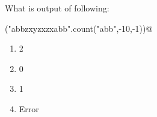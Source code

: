 \question
What is output of following:

\lstinline@print("abbzxyzxzxabb".count("abb",-10,-1))@

\begin{enumerate}
\item 2
\item 0
\item 1
\item Error
\end{enumerate}

